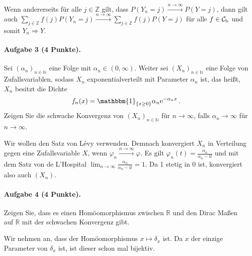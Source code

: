\documentclass{article}
\begin{document}
Wenn andererseits für alle $j\in\mathbb{Z}$ gilt, dass $P(Y_n=j)\xrightarrow{n\to\infty}P(Y=j)$, dann gilt auch $\sum_{j\in\mathbb{Z}}f(j)P(Y_n=j)\xrightarrow{n\to\infty}\sum_{j\in\mathbb{Z}}f(j)P(Y=j)$ für alle $f\in{\cal C}_\mathrm{b}$ und somit $Y_n\Rightarrow Y$.
\newpage

\paragraph{Aufgabe 3 \textnormal{(4 Punkte)}.} Sei $(\alpha_n)_{n\in\mathbb{N}}$ eine Folge mit $\alpha_n\in(0,\infty)$.
Weiter sei $(X_n)_{n\in\mathbb{N}}$ eine Folge von Zufallsvariablen, sodass $X_n$ exponentialverteilt mit Parameter $\alpha_n$ ist, das heißt, $X_n$ besitzt die Dichte
\[
  f_n(x)=\mathbbm{1}_{\{x\geq0\}}\alpha_n\mathrm{e}^{-\alpha_n x}\,.
\]
Zeigen Sie die schwache Konvergenz von $(X_n)_{n\in\mathbb{N}}$ für $n\to\infty$, falls $\alpha_n\to\infty$ für $n\to\infty$.

Wir wollen den Satz von Lévy verwenden.
Demnach konvergiert $X_n$ in Verteilung gegen eine Zufallsvariable $X$, wenn $\varphi_n\xrightarrow{n\to\infty}\varphi$.
Es gilt $\varphi_n(t)=\frac{\alpha_n}{\alpha_n-\mathrm{i}t}$ und mit dem Satz von de L'Hospital $\lim_{n\to\infty}\frac{\alpha_n}{\alpha_n-\mathrm{i}t}=1$.
Da 1 stetig in 0 ist, konvergiert also auch $(X_n)$.
\newpage

\paragraph{Aufgabe 4 \textnormal{(4 Punkte)}.}
Zeigen Sie, dass es einen Homöomorphismus zwischen $\mathbb{R}$ und den Dirac Maßen auf $\mathbb{R}$ mit der schwachen Konvergenz gibt.

Wir nehmen an, dass der Homöomorphismus $x\mapsto\delta_x$ ist.
Da $x$ der einzige Parameter von $\delta_x$ ist, ist dieser schon mal bijektiv.
\end{document}

